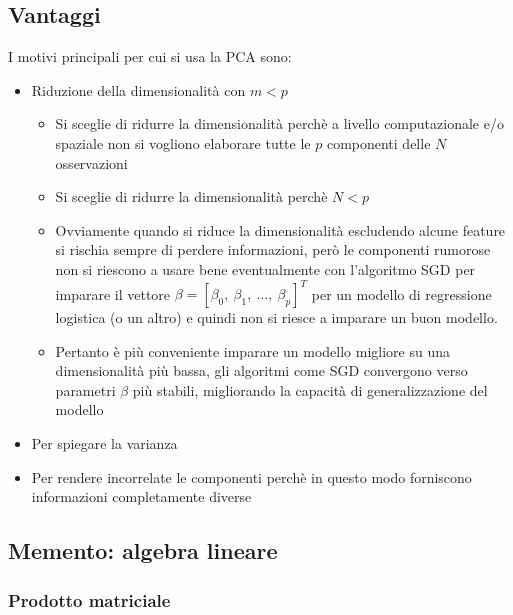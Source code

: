 \subsection{Vantaggi}
I motivi principali per cui si usa la PCA sono:
\begin{itemize}[noitemsep, topsep=3pt]
  \item Riduzione della dimensionalità con $m<p$
  \begin{itemize}[noitemsep, topsep=3pt]
	  \item Si sceglie di ridurre la dimensionalità perchè a livello computazionale e/o spaziale non si vogliono elaborare tutte le $p$ componenti delle $N$ osservazioni
	  \item Si sceglie di ridurre la dimensionalità perchè $N< p$
	  \item Ovviamente quando si riduce la dimensionalità escludendo alcune feature si rischia sempre di perdere informazioni, però le componenti rumorose non si riescono a usare bene eventualmente con l’algoritmo SGD per imparare il vettore $\beta=[\beta_0,\ \beta_1,\ \dots,\ \beta_p]^T$ per un modello di regressione logistica (o un altro) e quindi non si riesce a imparare un buon modello.
	  \item Pertanto è più conveniente imparare un modello migliore su una dimensionalità più bassa, gli algoritmi come SGD convergono verso parametri $\beta$ più stabili, migliorando la capacità di generalizzazione del modello
	\end{itemize}
  \item Per spiegare la varianza
  \item Per rendere incorrelate le componenti perchè in questo modo forniscono informazioni completamente diverse
\end{itemize}





\subsection{Memento: algebra lineare}

\subsubsection{Prodotto matriciale}


